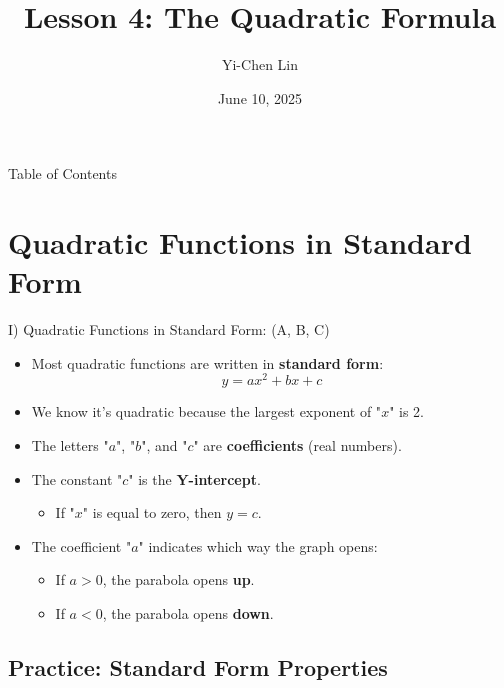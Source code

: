 \documentclass[aspectratio=169]{beamer}
\title{Lesson 4: The Quadratic Formula}
\author{Yi-Chen Lin}
\date{June 10, 2025}
\begin{document}
\begin{frame}
    \titlepage
\end{frame}

\begin{frame}{Table of Contents}
    \tableofcontents
\end{frame}

\section{Quadratic Functions in Standard Form}

\begin{frame}{I) Quadratic Functions in Standard Form: (A, B, C)}
    \begin{tcolorbox}[colback=lightgray,colframe=primary,title=Key Concepts]
        \footnotesize
        \begin{itemize}
            \item Most quadratic functions are written in \textbf{standard form}:
                \[ y = ax^2 + bx + c \]
            \item We know it's quadratic because the largest exponent of "$x$" is 2.
            \item The letters "$a$", "$b$", and "$c$" are \textbf{coefficients} (real numbers).
            \item The constant "$c$" is the \textbf{Y-intercept}.
                \begin{itemize}
                    \item If "$x$" is equal to zero, then $y = c$.
                \end{itemize}
            \item The coefficient "$a$" indicates which way the graph opens:
                \begin{itemize}
                    \item If $a > 0$, the parabola opens \textbf{up}.
                    \item If $a < 0$, the parabola opens \textbf{down}.
                \end{itemize}
        \end{itemize}
    \end{tcolorbox}
\end{frame}

\subsection{Practice: Standard Form Properties}
\end{document}
